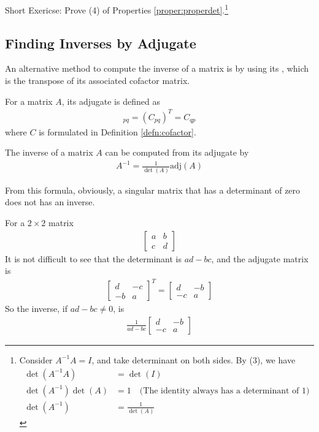 Short Exericse: Prove (4) of Properties \ref{proper:properdet}.\footnote{Consider $A^{-1}A=I$, and take determinant on both sides. By (3), we have
\begin{align*}
\det(A^{-1}A) &= \det(I) \\
\det(A^{-1})\det(A) &= 1 \quad \text{(The identity always has a determinant of $1$)} \\
\det(A^{-1}) &= \frac{1}{\det(A)}
\end{align*}}

\subsection{Finding Inverses by Adjugate}
An alternative method to compute the inverse of a matrix is by using its , which is the transpose of its associated cofactor matrix.
\begin{defn}[Adjugate]
For a matrix $A$, its adjugate is defined as
\begin{align*}
[\text{adj}(A)]_{pq} = (C_{pq})^{T} = C_{qp}
\end{align*}
where $C$ is formulated in Definition \ref{defn:cofactor}.
\end{defn}
\begin{proper}
\label{proper:invadj}
The inverse of a matrix $A$ can be computed from its adjugate by
\begin{align*}
A^{-1} = \frac{1}{\det(A)}\text{adj}(A)
\end{align*}
\end{proper}
From this formula, obviously, a singular matrix that has a determinant of zero does not has an inverse.
\begin{exmp}
\label{exmp:2x2}
For a $2 \times 2$ matrix
\begin{align*}
\begin{bmatrix}
a & b \\
c & d
\end{bmatrix}    
\end{align*}
It is not difficult to see that the determinant is $ad - bc$, and the adjugate matrix is
\begin{align*}
\begin{bmatrix}
d & -c \\
-b & a 
\end{bmatrix}^T = 
\begin{bmatrix}
d & -b \\
-c & a 
\end{bmatrix}    
\end{align*}
So the inverse, if $ad - bc \neq 0$, is
\begin{align*}
\frac{1}{ad-bc}
\begin{bmatrix}
d & -b \\
-c & a 
\end{bmatrix}
\end{align*}
\end{exmp}
